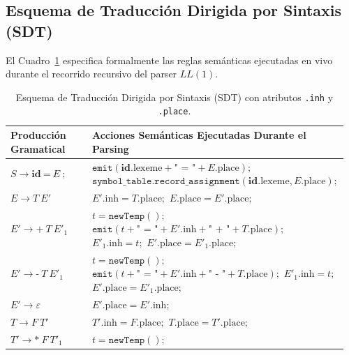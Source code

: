 \documentclass[11pt, letterpaper]{article}
\begin{document}
\subsection{Esquema de Traducción Dirigida por Sintaxis (SDT)}
El Cuadro~\ref{tab:sdt} especifica formalmente las reglas semánticas ejecutadas en vivo durante el recorrido recursivo del parser $LL(1)$.

\begin{table}[htbp]
\centering
\caption{Esquema de Traducción Dirigida por Sintaxis (SDT) con atributos \texttt{.inh} y \texttt{.place}.}
\label{tab:sdt}
\footnotesize
\renewcommand{\arraystretch}{1.35}
\begin{tabular}{@{}p{0.28\linewidth}p{0.68\linewidth}@{}}
\toprule
\textbf{Producción Gramatical} & \textbf{Acciones Semánticas Ejecutadas Durante el Parsing} \\
\midrule
$S \rightarrow \textbf{id}\ \textbf{=}\ E\ \textbf{;}$ &
$\texttt{emit}(\textbf{id}.\text{lexeme} + \texttt{" = "} + E.\text{place});$ \newline
$\texttt{symbol\_table.record\_assignment}(\textbf{id}.\text{lexeme}, E.\text{place});$ \\
\addlinespace[2pt]
$E \rightarrow T\ E'$ &
$E'.\text{inh} = T.\text{place};$ \newline
$E.\text{place} = E'.\text{place};$ \\
\addlinespace[2pt]
$E' \rightarrow \textbf{+}\ T\ E'_1$ &
$t = \texttt{newTemp}();$ \newline
$\texttt{emit}(t + \texttt{" = "} + E'.\text{inh} + \texttt{" + "} + T.\text{place});$ \newline
$E'_1.\text{inh} = t;$ \quad $E'.\text{place} = E'_1.\text{place};$ \\
\addlinespace[2pt]
$E' \rightarrow \textbf{-}\ T\ E'_1$ &
$t = \texttt{newTemp}();$ \newline
$\texttt{emit}(t + \texttt{" = "} + E'.\text{inh} + \texttt{" - "} + T.\text{place});$ \newline
$E'_1.\text{inh} = t;$ \quad $E'.\text{place} = E'_1.\text{place};$ \\
\addlinespace[2pt]
$E' \rightarrow \varepsilon$ &
$E'.\text{place} = E'.\text{inh};$ \\
\addlinespace[2pt]
$T \rightarrow F\ T'$ &
$T'.\text{inh} = F.\text{place};$ \newline
$T.\text{place} = T'.\text{place};$ \\
\addlinespace[2pt]
$T' \rightarrow \textbf{*}\ F\ T'_1$ &
$t = \texttt{newTemp}();$ \newline

\end{tabular}
\end{table}
\end{document}
